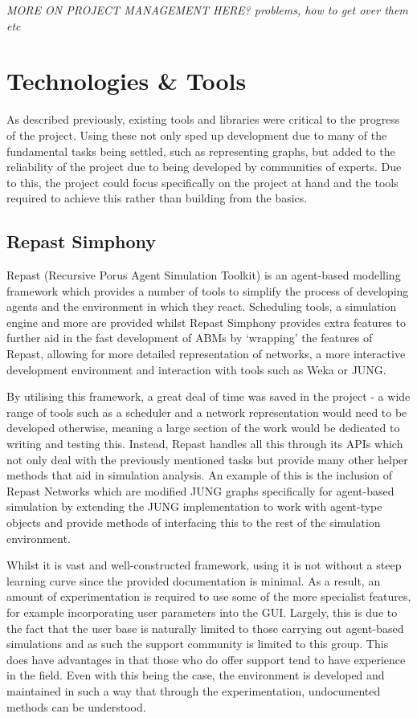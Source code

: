 \documentclass[]{report}
\begin{document}
\emph{MORE ON PROJECT MANAGEMENT HERE? problems, how to get over them etc}

\section{Technologies \& Tools}
As described previously, existing tools and libraries were critical to the progress of the project. Using these not only sped up development due to many of the fundamental tasks being settled, such as representing graphs, but added to the reliability of the project due to being developed by communities of experts. Due to this, the project could focus specifically on the project at hand and the tools required to achieve this rather than building from the basics.

\subsection{Repast Simphony}
Repast (Recursive Porus Agent Simulation Toolkit) is an agent-based modelling framework which provides a number of tools to simplify the process of developing agents and the environment in which they react\cite{repast-main}. Scheduling tools, a simulation engine and more are provided whilst Repast Simphony provides extra features to further aid in the fast development of ABMs by `wrapping' the features of Repast, allowing for more detailed representation of networks, a more interactive development environment and interaction with tools such as Weka or JUNG.

By utilising this framework, a great deal of time was saved in the project - a wide range of tools such as a scheduler and a network representation would need to be developed otherwise, meaning a large section of the work would be dedicated to writing and testing this. Instead, Repast handles all this through its APIs which not only deal with the previously mentioned tasks but provide many other helper methods that aid in simulation analysis. An example of this is the inclusion of Repast Networks which are modified JUNG graphs specifically for agent-based simulation by extending the JUNG implementation to work with agent-type objects and provide methods of interfacing this to the rest of the simulation environment.

Whilst it is vast and well-constructed framework, using it is not without a steep learning curve since the provided documentation is minimal. As a result, an amount of experimentation is required to use some of the more specialist features, for example incorporating user parameters into the GUI. Largely, this is due to the fact that the user base is naturally limited to those carrying out agent-based simulations and as such the support community is limited to this group. This does have advantages in that those who do offer support tend to have experience in the field. Even with this being the case, the environment is developed and maintained in such a way that through the experimentation, undocumented methods can be understood.
\end{document}
